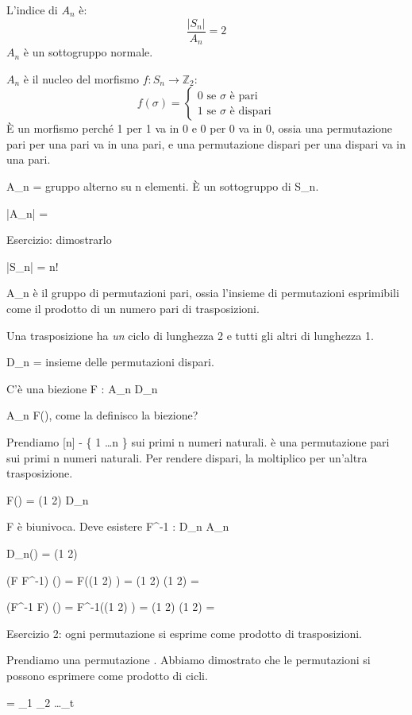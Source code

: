 L'indice di $A_n$ \`e:
\[
\frac{|S_n|}{A_n} = 2
\]
$A_n$ \`e un sottogruppo normale.

$A_n$ \`e il nucleo del morfismo $f : S_n \to \mathbb{Z}_2$:
\[
f (\sigma) = 
\begin{cases}
0 \text{ se } \sigma \text{ \`e pari} \\
1 \text{ se } \sigma \text{ \`e dispari} 
\end{cases}
\]
\`E un morfismo perch\'e 1 per 1 va in 0 e 0 per 0 va in 0, ossia una permutazione pari per una pari va in una pari, e una permutazione dispari per una dispari va in una pari.


A_n = gruppo alterno su n elementi. \`E un sottogruppo di S_n.

|A_n| = 

Esercizio: dimostrarlo

|S_n| = n!

A_n \`e il gruppo di permutazioni pari, ossia l'insieme di permutazioni esprimibili come il prodotto di un numero pari di trasposizioni.

Una trasposizione ha \textit{un} ciclo di lunghezza 2 e tutti gli altri di lunghezza 1.

D_n = insieme delle permutazioni dispari.

C'\`e una biezione F : A_n \to D_n

\forall \sigma \in A_n F(\sigma), come la definisco la biezione?

Prendiamo [n] - \{ 1 \dots n \} sui primi n numeri naturali. \sigma \`e una permutazione pari sui primi n numeri naturali. Per rendere \sigma dispari, la moltiplico per un'altra trasposizione.

F(\sigma) = (1 2) \cdot \sigma \in D_n

F \`e biunivoca. Deve esistere F^{-1} : D_n \to A_n

D_n(\sigma) = (1 2) \cdot \sigma

(F F^{-1}) (\delta) = F((1 2) \delta) = (1 2) \cdot (1 2) \delta = \delta

(F^{-1} F) (\sigma) = F^{-1}((1 2) \sigma) = (1 2) \cdot (1 2) \cdot \sigma = \sigma

Esercizio 2: ogni permutazione si esprime come prodotto di trasposizioni.

Prendiamo una permutazione \sigma. Abbiamo dimostrato che le permutazioni si possono esprimere come prodotto di cicli.

\sigma = \mu_1 \cdot \mu_2 \dots \mu_t

